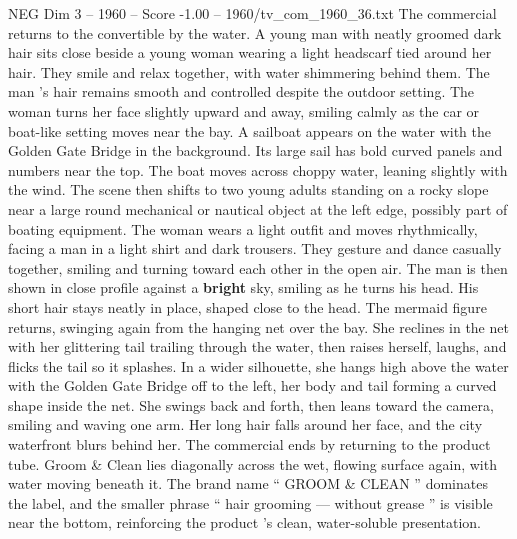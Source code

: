 \begin{textsample}{NEG Dim 3 – 1960 – Score -1.00 – 1960/tv\_com\_1960\_36.txt}
The commercial returns to the convertible by the water.
A young man with neatly groomed dark hair sits close beside a young woman wearing a light headscarf tied around her hair.
They smile and relax together, with water shimmering behind them.
The man ’s hair remains smooth and controlled despite the outdoor setting.
The woman turns her face slightly upward and away, smiling calmly as the car or boat-like setting moves near the bay.
A sailboat appears on the water with the Golden Gate Bridge in the background.
Its large sail has bold curved panels and numbers near the top.
The boat moves across choppy water, leaning slightly with the wind.
The scene then shifts to two young adults standing on a rocky slope near a large round mechanical or nautical object at the left edge, possibly part of boating equipment.
The woman wears a light outfit and moves rhythmically, facing a man in a light shirt and dark trousers.
They gesture and dance casually together, smiling and turning toward each other in the open air.
The man is then shown in close profile against a \textbf{bright} sky, smiling as he turns his head.
His short hair stays neatly in place, shaped close to the head.
The mermaid figure returns, swinging again from the hanging net over the bay.
She reclines in the net with her glittering tail trailing through the water, then raises herself, laughs, and flicks the tail so it splashes.
In a wider silhouette, she hangs high above the water with the Golden Gate Bridge off to the left, her body and tail forming a curved shape inside the net.
She swings back and forth, then leans toward the camera, smiling and waving one arm.
Her long hair falls around her face, and the city waterfront blurs behind her.
The commercial ends by returning to the product tube.
Groom \& Clean lies diagonally across the wet, flowing surface again, with water moving beneath it.
The brand name “ GROOM \& CLEAN ” dominates the label, and the smaller phrase “ hair grooming — without grease ” is visible near the bottom, reinforcing the product ’s clean, water-soluble presentation.

\end{textsample}
